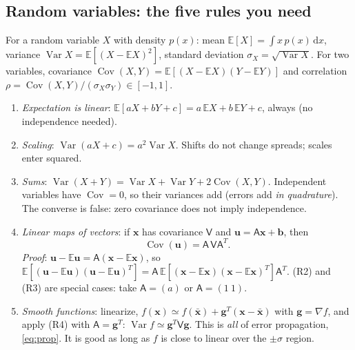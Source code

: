 \documentclass[11pt,a4paper]{article}
\numberwithin{equation}{section}
\theoremstyle{definition}
\theoremstyle{plain}
\theoremstyle{remark}
\numberwithin{algorithm}{section}
\newcommand{\dd}{\mathrm{d}}
\newcommand{\sA}{\mathsf A}
\newcommand{\sV}{\mathsf V}
\newcommand{\vg}{\bm g}
\begin{document}
\subsection{Random variables: the five rules you need}\label{sec:pr-rules}
For a random variable $X$ with density $p(x)$: mean $\mathbb E[X]=\int x\,p(x)\,\dd x$, variance $\operatorname{Var}X=\mathbb E[(X-\mathbb E X)^2]$, standard deviation $\sigma_X=\sqrt{\operatorname{Var}X}$. For two variables, covariance $\operatorname{Cov}(X,Y)=\mathbb E[(X-\mathbb EX)(Y-\mathbb EY)]$ and correlation $\rho=\operatorname{Cov}(X,Y)/(\sigma_X\sigma_Y)\in[-1,1]$.
\begin{enumerate}[leftmargin=2.2em,itemsep=3pt]
\item[(R1)] \emph{Expectation is linear}: $\mathbb E[aX+bY+c]=a\,\mathbb EX+b\,\mathbb EY+c$, always (no independence needed).
\item[(R2)] \emph{Scaling}: $\operatorname{Var}(aX+c)=a^2\operatorname{Var}X$. Shifts do not change spreads; scales enter squared.
\item[(R3)] \emph{Sums}: $\operatorname{Var}(X+Y)=\operatorname{Var}X+\operatorname{Var}Y+2\operatorname{Cov}(X,Y)$. Independent variables have $\operatorname{Cov}=0$, so their variances add (errors add \emph{in quadrature}). The converse is false: zero covariance does not imply independence.
\item[(R4)] \emph{Linear maps of vectors}: if $\bm x$ has covariance $\sV$ and $\bm u=\sA\bm x+\bm b$, then
\begin{equation}
\operatorname{Cov}(\bm u)=\sA\,\sV\sA^T .
\label{eq:pr-R4}
\end{equation}
\emph{Proof}: $\bm u-\mathbb E\bm u=\sA(\bm x-\mathbb E\bm x)$, so $\mathbb E[(\bm u-\mathbb E\bm u)(\bm u-\mathbb E\bm u)^T]=\sA\,\mathbb E[(\bm x-\mathbb E\bm x)(\bm x-\mathbb E\bm x)^T]\sA^T$. (R2) and (R3) are special cases: take $\sA=(a)$ or $\sA=(1\ 1)$.
\item[(R5)] \emph{Smooth functions}: linearize, $f(\bm x)\simeq f(\bar{\bm x})+\vg^T(\bm x-\bar{\bm x})$ with $\vg=\nabla f$, and apply (R4) with $\sA=\vg^T$: $\operatorname{Var}f\simeq\vg^T\sV\vg$. This is \emph{all} of error propagation, \eqref{eq:prop}. It is good as long as $f$ is close to linear over the $\pm\sigma$ region.
\end{enumerate}
\end{document}

